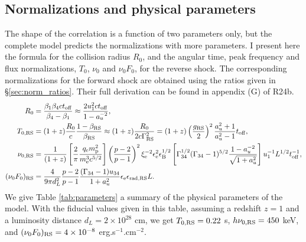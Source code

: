 \documentclass{article}
\newcommand{\off}{{\rm off}}
\newcommand{\RS}{{\rm RS}}
\begin{document}
\subsection{Normalizations and physical parameters}
The shape of the correlation is a function of two parameters only, but the complete model predicts the normalizations with more parameters. I present here the formula for the collision radius $R_0$, and the angular time, peak frequency and flux normalizations, $T_0$, $\nu_0$ and $\nu_0 F_0$, for the reverse shock. The corresponding normalizations for the forward shock are obtained using the ratios given in \S \ref{sec:norm_ratios}. Their full derivation can be found in appendix (G) of R24b.
\begin{align}
    R_0 &= \frac{\beta_1\beta_4ct_{\rm off}}{\beta_4 - \beta_1}\approx\frac{2u_1^2ct_{\rm off}}{1-a_u^{-2}},\\
    T_{0,\RS} &= (1+z) \frac{R_0}{c}\frac{1-\beta_\RS}{\beta_\RS} \approx (1+z) \frac{R_0}{2c\Gamma_\RS^2} = (1+z) \left(\frac{g_\RS}{2}\right)^2\frac{a_u^2+1}{a_u^2-1}t_\off,\\
    \nu_{0,\RS} &= \frac{1}{(1+z)}\left[\frac{2}{\pi}\frac{q_{\rm e} m_{\rm p}^2}{m_{\rm e}^3c^{5/2}}\right]\left(\frac{p-2}{p-1}\right)^2\xi_{\rm e}^{-2}\epsilon_{\rm e}^2\epsilon_{\rm B}^{1/2}\left[\Gamma_{34}^{1/2}(\Gamma_{34}-1)^{5/2}\frac{1-a_u^{-2}}{\sqrt{1+a_u^2}}\right]u_1^{-1}L^{1/2}t_{\rm off}^{-1},\\
    (\nu_0 F_0)_\RS &= \frac{4}{9\pi d_L^2}\frac{p-2}{p-1}\frac{(\Gamma_{34}-1)u_{34}}{1+a_u^2}\epsilon_{\rm e}\epsilon_{\rm rad,\RS}L.
\end{align}
We give Table \ref{tab:parameters} a summary of the physical parameters of the model. With the fiducial values given in this table, assuming a redshift $z=1$ and a luminosity distance $d_L=2\times10^{28}$ cm, we get $T_{0,\RS}=0.22$ s, $h\nu_{0,\RS}=450$ keV, and $(\nu_0 F_0)_\RS=4\times10^{-8}$ erg.s$^{-1}$.cm$^{-2}$.
\end{document}
